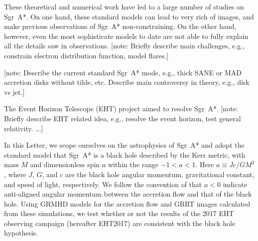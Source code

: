 \documentclass[twocolumn,tighten,dvipsnames]{aastex63}
\newcommand\sgra{Sgr~A*\xspace}
\newcommand\mbh{{M}} %
\newcommand\abh{{a}} %
\newcommand\<{{\langle}}
\renewcommand\>{{\rangle}} %
\newcommand\note[1]{{\color{OliveGreen}[note: #1]}}
\begin{document}
These theoretical and numerical work have led to a large number of
studies on \sgra \citep[e.g.,][]{ 2006MNRAS.370..219M,
  2007MNRAS.379.1519M, 2009A&A...508L..13M, 2009ApJ...698..676D,
  2009ApJ...701..521C, 2009ApJ...706..497M, 2012MNRAS.421.1315Z,
  2013A&A...559L...3M, 2014A&A...570A...7M, 2014ApJ...790....1B,
  2015A&A...576A..41B, 2015ApJ...799....1C, 2015ApJ...802...69B,
  2015ApJ...812..103C, 2015ApJ...814..115P, 2015Sci...350.1242J,
  2016A&A...588A..57F, 2016ApJ...817..173L, 2016ApJ...818..121P,
  2016ApJ...824...40O, 2016ApJ...826...77B, 2016ApJ...831....4P,
  2016MNRAS.455.2187M, 2016PhRvL.116c1101J, 2017ApJ...837..180G,
  2017ApJ...844...35M, 2017ApJ...851..148M, 2017MNRAS.467.3604R,
  2018A&A...612A..34D, 2018ApJ...856..163M, 2018ApJ...859...60L,
  2018ApJ...863..148P, 2018ApJ...865..104J, 2018ApJ...868..101B,
  2018JCAP...07..015H, 2018MNRAS.478.1875J, 2018MNRAS.478.5209C,
  2019ApJ...871...30I, 2019ApJ...881L...2B, 2019ApJ...884..148B,
  2019ApJ...886...96H, 2019GReGr..51..137P, 2020ApJ...896L...6R,
  2020ApJ...897...99T, 2020MNRAS.492.3272R, 2020MNRAS.493.1404A,
  2020MNRAS.494.4168D, 2020MNRAS.494.5923P, 2020arXiv200514251B,
  2020arXiv200603657D, 2020arXiv200603658P}.
On one hand, these standard models can lead to very rich of images,
and make previous observations of \sgra non-constraining.
On the other hand, however, even the most sophisticate models to date
are not able to fully explain all the details saw in observations.
\note{Briefly describe main challenges, e.g., constrain electron
  distribution function, model flares.}

\note{Describe the current standard \sgra mode, e.g., thick SANE or
  MAD accretion disks without tilde, etc.
  Describe main controversy in theory, e.g., disk vs jet.}

The Event Horizon Telescope (EHT) project aimed to resolve \sgra.
\note{Briefly describe EHT related idea, e.g., resolve the event
  horizon, test general relativity.
  \citet{2000ApJ...528L..13F} ...}

In this Letter, we scope ourselves on the astrophysics of \sgra and
adopt the standard model that \sgra is a black hole described by the
Kerr metric, with mass $\mbh$ and dimensionless spin $\abh$ within the
range $-1 < \abh < 1$.
Here $\abh \equiv Jc/G\mbh^2$, where $J$, $G$, and $c$ are the black
hole angular momentum, gravitational constant, and speed of light,
respectively.
We follow the convention of  that
$\abh < 0$ indicate anti-aligned angular momentum between the
accretion flow and that of the black hole.
Using GRMHD models for the accretion flow and GRRT images calculated
from these simulations, we test whether or not the results of the 2017
EHT observing campaign (hereafter EHT2017) are consistent with the
black hole hypothesis.
\end{document}
